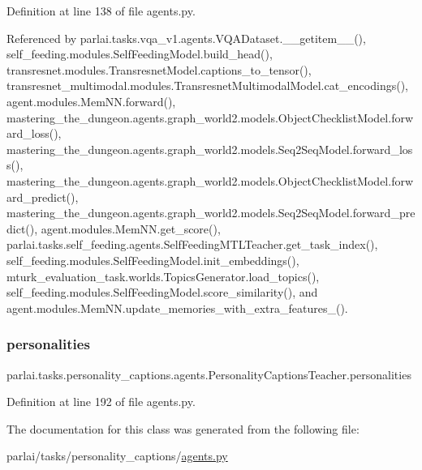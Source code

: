 Definition at line 138 of file agents.\+py.



Referenced by parlai.\+tasks.\+vqa\+\_\+v1.\+agents.\+V\+Q\+A\+Dataset.\+\_\+\+\_\+getitem\+\_\+\+\_\+(), self\+\_\+feeding.\+modules.\+Self\+Feeding\+Model.\+build\+\_\+head(), transresnet.\+modules.\+Transresnet\+Model.\+captions\+\_\+to\+\_\+tensor(), transresnet\+\_\+multimodal.\+modules.\+Transresnet\+Multimodal\+Model.\+cat\+\_\+encodings(), agent.\+modules.\+Mem\+N\+N.\+forward(), mastering\+\_\+the\+\_\+dungeon.\+agents.\+graph\+\_\+world2.\+models.\+Object\+Checklist\+Model.\+forward\+\_\+loss(), mastering\+\_\+the\+\_\+dungeon.\+agents.\+graph\+\_\+world2.\+models.\+Seq2\+Seq\+Model.\+forward\+\_\+loss(), mastering\+\_\+the\+\_\+dungeon.\+agents.\+graph\+\_\+world2.\+models.\+Object\+Checklist\+Model.\+forward\+\_\+predict(), mastering\+\_\+the\+\_\+dungeon.\+agents.\+graph\+\_\+world2.\+models.\+Seq2\+Seq\+Model.\+forward\+\_\+predict(), agent.\+modules.\+Mem\+N\+N.\+get\+\_\+score(), parlai.\+tasks.\+self\+\_\+feeding.\+agents.\+Self\+Feeding\+M\+T\+L\+Teacher.\+get\+\_\+task\+\_\+index(), self\+\_\+feeding.\+modules.\+Self\+Feeding\+Model.\+init\+\_\+embeddings(), mturk\+\_\+evaluation\+\_\+task.\+worlds.\+Topics\+Generator.\+load\+\_\+topics(), self\+\_\+feeding.\+modules.\+Self\+Feeding\+Model.\+score\+\_\+similarity(), and agent.\+modules.\+Mem\+N\+N.\+update\+\_\+memories\+\_\+with\+\_\+extra\+\_\+features\+\_\+().

\mbox{\label{classparlai_1_1tasks_1_1personality__captions_1_1agents_1_1PersonalityCaptionsTeacher_a54abcd754a4e302cab34efb2448ed4d5}} 
\subsubsection{\texorpdfstring{personalities}{personalities}}
{\footnotesize\ttfamily parlai.\+tasks.\+personality\+\_\+captions.\+agents.\+Personality\+Captions\+Teacher.\+personalities}



Definition at line 192 of file agents.\+py.



The documentation for this class was generated from the following file\+:\begin{DoxyCompactItemize}
\item 
parlai/tasks/personality\+\_\+captions/\hyperlink{parlai_2tasks_2personality__captions_2agents_8py}{agents.\+py}\end{DoxyCompactItemize}
